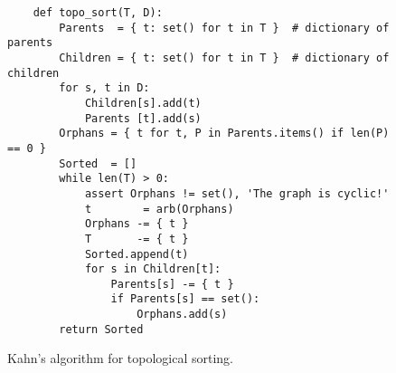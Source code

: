 \begin{figure}[!ht]
\centering
\begin{verbatim}
    def topo_sort(T, D):
        Parents  = { t: set() for t in T }  # dictionary of parents
        Children = { t: set() for t in T }  # dictionary of children
        for s, t in D:
            Children[s].add(t)
            Parents [t].add(s)
        Orphans = { t for t, P in Parents.items() if len(P) == 0 }
        Sorted  = []
        while len(T) > 0:
            assert Orphans != set(), 'The graph is cyclic!'
            t        = arb(Orphans)
            Orphans -= { t }
            T       -= { t }
            Sorted.append(t)
            for s in Children[t]:
                Parents[s] -= { t }
                if Parents[s] == set():
                    Orphans.add(s)
        return Sorted
\end{verbatim}
\vspace*{-0.3cm}
\caption{Kahn's algorithm for topological sorting.}
\label{fig:Topologocal-Sorting.ipynb}
\end{figure}

